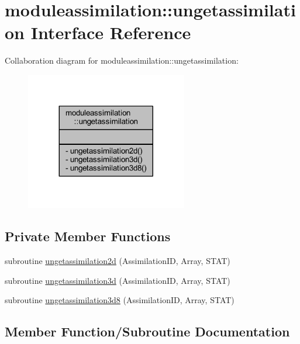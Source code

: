 \hypertarget{interfacemoduleassimilation_1_1ungetassimilation}{}\section{moduleassimilation\+:\+:ungetassimilation Interface Reference}
\label{interfacemoduleassimilation_1_1ungetassimilation}


Collaboration diagram for moduleassimilation\+:\+:ungetassimilation\+:\nopagebreak
\begin{figure}[H]
\begin{center}
\leavevmode
\includegraphics[width=200pt]{interfacemoduleassimilation_1_1ungetassimilation__coll__graph}
\end{center}
\end{figure}
\subsection*{Private Member Functions}
\begin{DoxyCompactItemize}
\item 
subroutine \mbox{\hyperlink{interfacemoduleassimilation_1_1ungetassimilation_a52c2cfd67470baf650d2346b5ce4184e}{ungetassimilation2d}} (Assimilation\+ID, Array, S\+T\+AT)
\item 
subroutine \mbox{\hyperlink{interfacemoduleassimilation_1_1ungetassimilation_a1118e427261e8012b6f0b8502f38346d}{ungetassimilation3d}} (Assimilation\+ID, Array, S\+T\+AT)
\item 
subroutine \mbox{\hyperlink{interfacemoduleassimilation_1_1ungetassimilation_ac719d962853df4e9dda556249756280b}{ungetassimilation3d8}} (Assimilation\+ID, Array, S\+T\+AT)
\end{DoxyCompactItemize}


\subsection{Member Function/\+Subroutine Documentation}
\mbox{\label{interfacemoduleassimilation_1_1ungetassimilation_a52c2cfd67470baf650d2346b5ce4184e}} 
